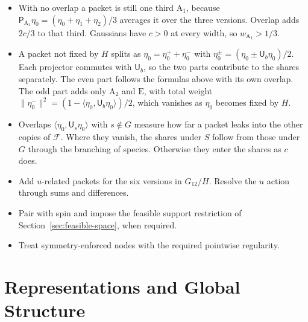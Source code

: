 \documentclass[11pt]{article}
\newcommand{\Uop}{\mathsf{U}}
\begin{document}
\begin{itemize}
\item With no overlap a packet is still one third $\mathrm A_1$, because
$\mathsf P_{\mathrm A_1}\eta_0=(\eta_0+\eta_1+\eta_2)/3$ averages it over the three versions. Overlap
adds $2c/3$
to that third. Gaussians have $c>0$ at every width, so $w_{\mathrm A_1}>1/3$.
\item A packet not fixed by $H$ splits as $\eta_0=\eta_0^++\eta_0^-$ with
$\eta_0^\pm=(\eta_0\pm\Uop_b\eta_0)/2$. Each projector commutes with $\Uop_b$, so the two parts
contribute to the shares separately. The even part follows the formulas above with its own overlap. The odd
part adds only $\mathrm A_2$ and $\mathrm E$, with total weight
$\|\eta_0^-\|^2=(1-\langle\eta_0,\Uop_b\eta_0\rangle)/2$, which vanishes as $\eta_0$ becomes fixed by $H$.
\item Overlaps $\langle\eta_0,\Uop_s\eta_0\rangle$ with $s\notin G$ measure how far a packet leaks into
the other copies of $\mathcal F$. Where they vanish, the shares under $S$ follow from those under $G$
through the branching of species. Otherwise they enter the shares as $c$ does.
\item Add $u$-related packets for the six versions in $G_{12}/H$.
Resolve the $u$ action through sums and differences.
\item Pair with spin and impose the feasible support restriction
of Section~\ref{sec:feasible-space}, when required.
\item Treat symmetry-enforced nodes with the required pointwise regularity.
\end{itemize}

\section{Representations and Global Structure}
\end{document}
